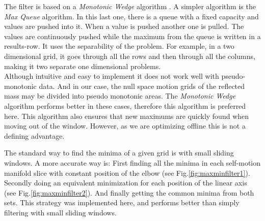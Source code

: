 The filter is based on a \textit{Monotonic Wedge} algorithm \cite{Lemire}.
A simpler algorithm is the \textit{Max Queue} algorithm. In this last one, there is a queue with a fixed capacity and values are pushed into it. When a value is pushed another one is pulled. The values are continuously pushed while the maximum from the queue is written in a results-row.
It uses the separability of the problem.  For example, in a two dimensional grid, it goes through all the rows and then through all the columns, making it two separate one dimensional problems.\\
%
Although intuitive and easy to implement it does not work well with pseudo-monotonic data. And in our case, the null space motion grids of the reflected mass may be divided into pseudo monotonic areas. The \textit{Monotonic Wedge} algorithm performs better in these cases, therefore this algorithm is preferred here. This algorithm also ensures that new maximums are quickly found when moving out of the window. However, as we are optimizing offline this is not a defining advantage.






The standard way to find the minima of a given grid is with small sliding windows. A more accurate way is: First finding all the minima in each self-motion manifold slice with constant position of the elbow (see Fig.\ref{fig:maxminfilter1}). Secondly doing an equivalent minimization for each position of the linear axis (see Fig.\ref{fig:maxminfilter2}). 
And finally getting the common minima from both sets. This strategy was implemented here, and performs better than simply filtering with small sliding windows. 

